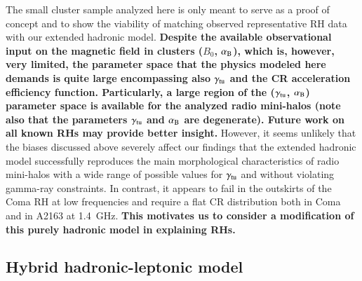\documentclass[useAMS,usenatbib]{mn2e}
\begin{document}
The small cluster sample analyzed here is only meant to serve as a proof
of concept and to show the viability of matching observed representative 
RH data with our extended hadronic model. {\bf Despite the available
observational input on the magnetic field in clusters ($B_0$, $ \alpha_{{\mathrm{B}}}$), 
which is, however, very limited, the parameter space that the physics modeled here 
demands is quite large encompassing also $\gamma_{{\mathrm{tu}}}$ and the CR acceleration 
efficiency function. Particularly, a large region of the ($\gamma_{{\mathrm{tu}}}$,
$\alpha_{{\mathrm{B}}}$) parameter space is available for the analyzed radio
mini-halos (note also that the parameters $\gamma_{{\mathrm{tu}}}$ and
$\alpha_{{\mathrm{B}}}$ are degenerate). Future work on all known RHs may 
provide better insight.}
% 
%
However, it seems unlikely that the biases discussed above severely affect our findings
that the extended hadronic model successfully reproduces the main morphological
characteristics of radio mini-halos with a wide range of possible values for
$\gamma_{{\mathrm{tu}}}$ and without violating gamma-ray constraints. In contrast, it
appears to fail in the outskirts of the Coma RH at low frequencies and
require a flat CR distribution both in Coma and in A2163 at 1.4~GHz. {\bf This motivates 
us to consider a modification of this purely hadronic model in explaining RHs.} 



\subsection{Hybrid hadronic-leptonic model}
\end{document}
